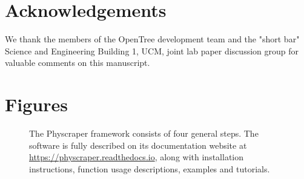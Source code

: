 \documentclass{bmcart}
\begin{document}
\begin{backmatter}
\section*{Acknowledgements}
We thank the members of the OpenTree development team and the "short bar" Science
and Engineering Building 1, UCM, joint lab paper discussion group for valuable
comments on this manuscript.







\section*{Figures}
  \begin{figure}[h!]
  \caption{The Physcraper framework consists of four general steps. The software is fully
  described on its documentation website at \href{https://physcraper.readthedocs.io}{https://physcraper.readthedocs.io},
  along with installation instructions, function usage descriptions, examples and tutorials.
}
\end{figure}


\end{backmatter}
\end{document}

